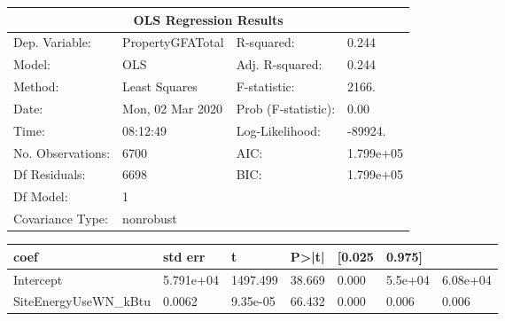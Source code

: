 \begin{table*}[p]
\centering
\begin{tabular}{@{}llll@{}}
\toprule
\multicolumn{4}{c}{OLS Regression Results}                             \\ \midrule
Dep. Variable:    & PropertyGFATotal & R-squared:          & 0.244     \\
Model:            & OLS              & Adj. R-squared:     & 0.244     \\
Method:           & Least Squares    & F-statistic:        & 2166.     \\
Date:             & Mon, 02 Mar 2020 & Prob (F-statistic): & 0.00      \\
Time:             & 08:12:49         & Log-Likelihood:     & -89924.   \\
No. Observations: & 6700             & AIC:                & 1.799e+05 \\
Df Residuals:     & 6698             & BIC:                & 1.799e+05 \\
Df Model:         & 1                &                     &           \\
Covariance Type:  & nonrobust        &                     &           \\ \bottomrule
\end{tabular}
\end{table*}

\begin{table*}[p]
  \centering
\begin{tabular}{@{}lllllll@{}}
\toprule
coef                  & std err   & t        & P\textgreater{}|t| & {[}0.025 & 0.975{]} &          \\ \midrule
Intercept             & 5.791e+04 & 1497.499 & 38.669             & 0.000    & 5.5e+04  & 6.08e+04 \\
SiteEnergyUseWN\_kBtu & 0.0062    & 9.35e-05 & 66.432             & 0.000    & 0.006    & 0.006    \\ \bottomrule
\end{tabular}
\end{table*}

